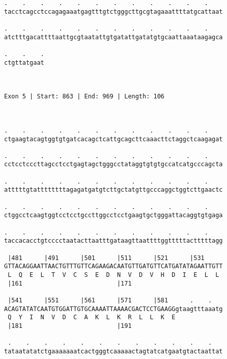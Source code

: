 \documentclass{article}
\begin{document}
\begin{Verbatim}
.    .    .    .    .    .    .    .    .    .    .    .    
tacctcagcctccagagaaatgagtttgtctgggcttgcgtagaaattttatgcattaat
                                                            
.    .    .    .    .    .    .    .    .    .    .    .    
atctttgacattttaattgcgtaatattgtgatattgatatgtgcaattaaataagagca
                                                            
.    .    .
ctgttatgaat
           
           
 
Exon 5 | Start: 863 | End: 969 | Length: 106



.    .    .    .    .    .    .    .    .    .    .    .    
ctgaagtacagtggtgtgatcacagctcattgcagcttcaaacttctaggctcaagagat
                                                            
.    .    .    .    .    .    .    .    .    .    .    .    
cctcctcccttagcctcctgagtagctgggcctataggtgtgtgccatcatgcccagcta
                                                            
.    .    .    .    .    .    .    .    .    .    .    .    
atttttgtattttttttagagatgatgtcttgctatgttgcccaggctggtcttgaactc
                                                            
.    .    .    .    .    .    .    .    .    .    .    .    
ctggcctcaagtggtcctcctgccttggcctcctgaagtgctgggattacaggtgtgaga
                                                            
.    .    .    .    .    .    .    .    .    .    .    .    
taccacacctgtcccctaatacttaatttgataagttaattttggtttttactttttagg
                                                            
 |481      |491      |501      |511      |521      |531     
GTTACAGGAATTAACTGTTTGTTCAGAAGACAATGTTGATGTTCATGATATAGAATTGTT
 L  Q  E  L  T  V  C  S  E  D  N  V  D  V  H  D  I  E  L  L 
 |161                          |171                         
  
 |541      |551      |561      |571      |581      .    .   
ACAGTATATCAATGTGGATTGTGCAAAATTAAAACGACTCCTGAAGGgtaagtttaaatg
 Q  Y  I  N  V  D  C  A  K  L  K  R  L  L  K  E             
 |181                          |191                         
  
 .    .    .    .    .    .    .    .    .    .    .    .   
tataatatatctgaaaaaaatcactgggtcaaaaactagtatcatgaatgtactaattat
                                                            

\end{Verbatim}
\end{document}
